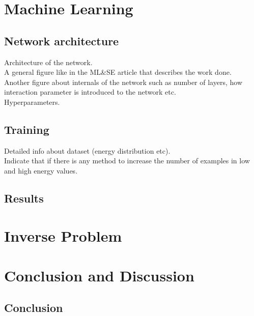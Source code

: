 \documentclass[a4paper,times,hidelinks,12pt]{article}
\begin{document}
%		


\section{Machine Learning}
\subsection{Network architecture}
\noindent Architecture of the network.\\
    A general figure like in the ML\&SE article that describes the work done.\\
    Another figure about internals of the network such as number of layers, how interaction parameter is introduced to the network etc.\\
    Hyperparameters.\\
\subsection{Training}
\noindent    Detailed info about dataset (energy distribution etc).\\
    Indicate that if there is any method to increase the number of examples in low and high energy values.

\subsection{Results}

\section{Inverse Problem}

\clearpage
\section{Conclusion and Discussion}
\subsection{Conclusion}
\end{document}
